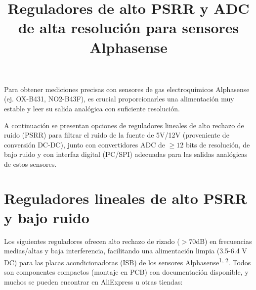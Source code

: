 \documentclass[a4paper, 12pt]{article}
\title{Reguladores de alto PSRR y ADC de alta resolución para sensores Alphasense}
\author{} %
\date{} %
\begin{document}
\maketitle

Para obtener mediciones precisas con sensores de gas electroquímicos Alphasense (ej. OX-B431, NO2-B43F), es crucial proporcionarles una alimentación muy estable y leer su salida analógica con suficiente resolución.

A continuación se presentan opciones de reguladores lineales de alto rechazo de ruido (PSRR) para filtrar el ruido de la fuente de 5V/12V (proveniente de conversión DC-DC), junto con convertidores ADC de $\ge 12$ bits de resolución, de bajo ruido y con interfaz digital (I²C/SPI) adecuadas para las salidas analógicas de estos sensores.

\section*{Reguladores lineales de alto PSRR y bajo ruido}

Los siguientes reguladores ofrecen alto rechazo de rizado ($>70$dB) en frecuencias medias/altas y baja interferencia, facilitando una alimentación limpia (3.5-6.4 V DC) para las placas acondicionadoras (ISB) de los sensores Alphasense\textsuperscript{1, 2}. Todos son componentes compactos (montaje en PCB) con documentación disponible, y muchos se pueden encontrar en AliExpress u otras tiendas:
\end{document}
